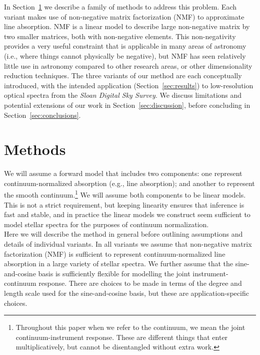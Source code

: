 \documentclass[modern]{aastex631}
\begin{document}
In Section~\ref{sec:methods} we describe a family of methods to address this problem. Each variant makes use of non-negative matrix factorization (NMF) to approximate line absorption. NMF is a linear model to describe large non-negative matrix by two smaller matrices, both with non-negative elements. This non-negativity provides a very useful constraint that is applicable in many areas of astronomy (i.e., where things cannot physically be negative), but NMF has seen relatively little use in astronomy compared to other research areas, or other dimensionality reduction techniques. The three variants of our method are each conceptually introduced, with the intended application (Section~\ref{sec:results}) to low-resolution optical spectra from the \emph{Sloan Digital Sky Survey}. We discuss limitations and potential extensions of our work in Section~\ref{sec:discussion}, before concluding in Section~\ref{sec:conclusions}.\\

\section{Methods}\label{sec:methods}

We will assume a forward model that includes two components: one represent continuum-normalized absorption (e.g., line absorption); and another to represent the smooth continuum.\footnote{Throughout this paper when we refer to the continuum, we mean the joint continuum-instrument response. These are different things that enter multiplicatively, but cannot be disentangled without extra work.} We will assume both components to be linear models. This is not a strict requirement, but keeping linearity ensures that inference is fast and stable, and in practice the linear models we construct seem sufficient to model stellar spectra for the purposes of continuum normalization.\\

Here we will describe the method in general before outlining assumptions and details of individual variants. In all variants we assume that non-negative matrix factorization (NMF) is sufficient to represent continuum-normalized line absorption in a large variety of stellar spectra. We further assume that the sine-and-cosine basis is sufficiently flexible for modelling the joint instrument-continuum response. There are choices to be made in terms of the degree and length scale used for the sine-and-cosine basis, but these are application-specific choices.\\
\end{document}
